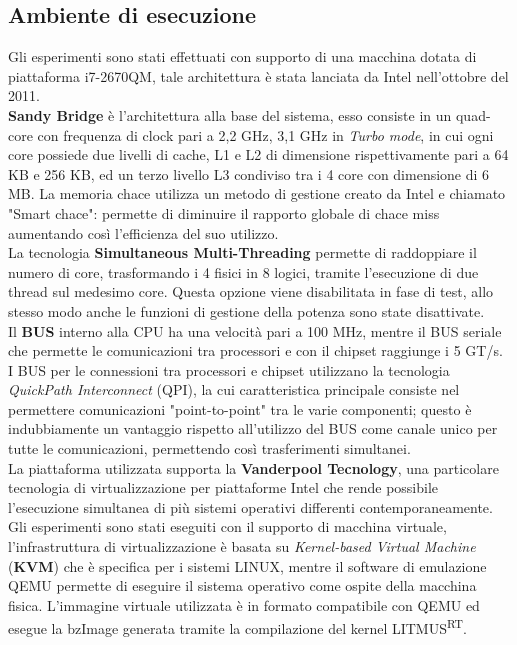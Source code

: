 \newpage

\subsection{Ambiente di esecuzione}
\label{sec:ambiente}

\noindent Gli esperimenti sono stati effettuati con supporto di una macchina dotata di piattaforma i7-2670QM, tale architettura è stata lanciata da Intel nell'ottobre del 2011.\\
\textbf{Sandy Bridge} è l'architettura alla base del sistema, esso consiste in un quad-core con frequenza di clock pari a 2,2 GHz, 3,1 GHz in \textit{Turbo mode}, in cui ogni core possiede due livelli di cache, L1 e L2 di dimensione rispettivamente pari a 64 KB e 256 KB, ed un terzo livello L3 condiviso tra i 4 core con dimensione di 6 MB. La memoria chace utilizza un metodo di gestione creato da Intel e chiamato "Smart chace": permette di diminuire il rapporto globale di chace miss aumentando così l'efficienza del suo utilizzo.\\
La tecnologia \textbf{Simultaneous Multi-Threading} permette di raddoppiare il numero di core, trasformando i 4 fisici in 8 logici, tramite l'esecuzione di due thread sul medesimo core. Questa opzione viene disabilitata in fase di test, allo stesso modo anche le funzioni di gestione della potenza sono state disattivate.\\
Il \textbf{BUS} interno alla CPU ha una velocità pari a 100 MHz, mentre il BUS seriale che permette le comunicazioni tra processori e con il chipset raggiunge i 5 GT/s. I BUS per le connessioni tra processori e chipset utilizzano la tecnologia \textit{QuickPath Interconnect} (QPI), la cui caratteristica principale consiste nel permettere comunicazioni "point-to-point" tra le varie componenti; questo è indubbiamente un vantaggio rispetto all'utilizzo del BUS come canale unico per tutte le comunicazioni, permettendo così trasferimenti simultanei.\\
La piattaforma utilizzata supporta la \textbf{Vanderpool Tecnology}, una particolare tecnologia di virtualizzazione per piattaforme Intel che rende possibile l'esecuzione simultanea di più sistemi operativi differenti contemporaneamente.\\

\noindent Gli esperimenti sono stati eseguiti con il supporto di macchina virtuale, l'infrastruttura di virtualizzazione è basata su \textit{Kernel-based Virtual Machine} (\textbf{KVM}) che è specifica per i sistemi LINUX, mentre il software di emulazione QEMU permette di eseguire il sistema operativo come ospite della macchina fisica. L'immagine virtuale utilizzata è in formato compatibile con QEMU ed esegue la bzImage generata tramite la compilazione del kernel LITMUS\textsuperscript{RT}.\\

